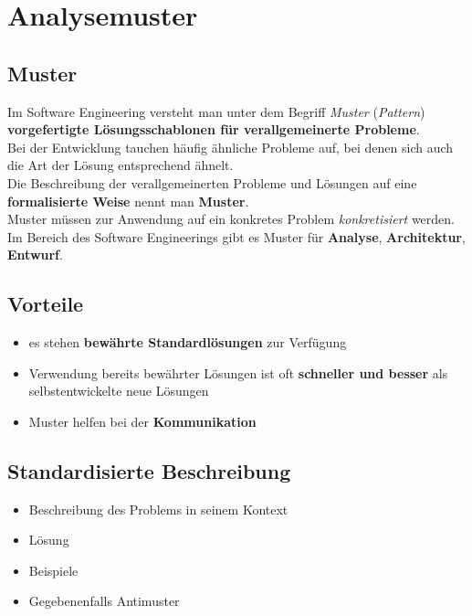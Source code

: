 \section{Analysemuster}\label{sec:analysemuster}

\subsection*{Muster}
Im Software Engineering versteht man unter dem Begriff \textit{Muster} (\textit{Pattern}) \textbf{vorgefertigte Lösungsschablonen für verallgemeinerte Probleme}.\\

\noindent
Bei der Entwicklung tauchen häufig ähnliche Probleme auf, bei denen sich auch die Art der Lösung entsprechend ähnelt.\\

\noindent
Die Beschreibung der verallgemeinerten Probleme und Lösungen auf eine \textbf{formalisierte Weise} nennt man \textbf{Muster}.\\

\noindent
Muster müssen zur Anwendung auf ein konkretes Problem \textit{konkretisiert} werden.\\

\noindent
Im Bereich des Software Engineerings gibt es Muster für \textbf{Analyse}, \textbf{Architektur}, \textbf{Entwurf}.

\subsection*{Vorteile}

\begin{itemize}
    \item es stehen \textbf{bewährte Standardlösungen} zur Verfügung
    \item Verwendung bereits bewährter Lösungen ist oft \textbf{schneller und besser} als selbstentwickelte neue Lösungen
    \item Muster helfen bei der \textbf{Kommunikation}
\end{itemize}


\subsection*{Standardisierte Beschreibung}

\begin{itemize}
    \item Beschreibung des Problems in seinem Kontext
    \item Lösung
    \item Beispiele
    \item Gegebenenfalls Antimuster
\end{itemize}


